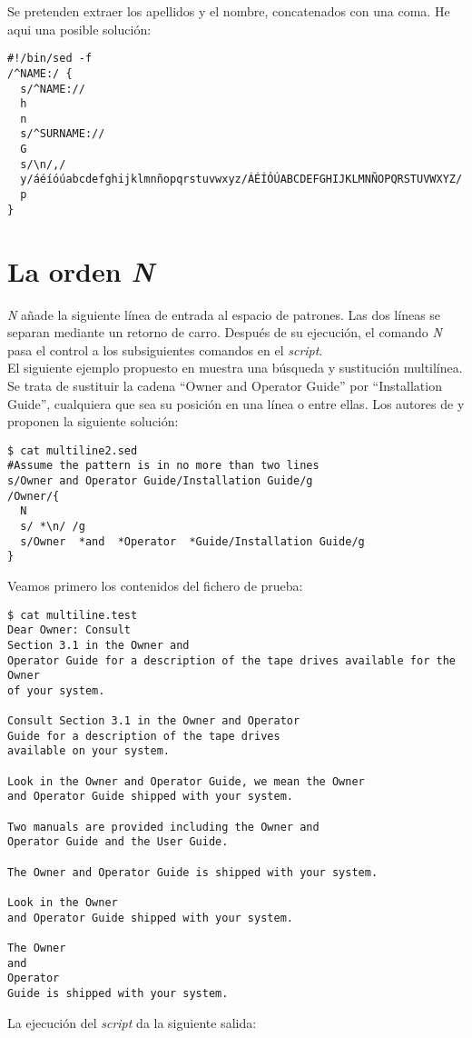 Se pretenden extraer los apellidos y el nombre, concatenados con una coma. He aqui una posible solución:
\begin{verbatim}
#!/bin/sed -f
/^NAME:/ {
  s/^NAME://
  h
  n
  s/^SURNAME://
  G
  s/\n/,/
  y/áéíóúabcdefghijklmnñopqrstuvwxyz/ÁÉÍÓÚABCDEFGHIJKLMNÑOPQRSTUVWXYZ/
  p
}
\end{verbatim}

\section{La orden {\it N}}
{\it N} añade la siguiente línea de entrada al espacio de
patrones. Las dos líneas se separan mediante un retorno de
carro. Después de su ejecución, el comando {\it N} pasa el control a los
subsiguientes comandos en el {\it script}.\\
El siguiente ejemplo propuesto en \cite{sedawk} muestra una
búsqueda y sustitución multilínea. Se trata de sustituir la
cadena ``Owner and Operator Guide'' por ``Installation Guide'', cualquiera que sea su posición en una línea o entre ellas.
Los autores de \cite{sedawk} y \cite{power} proponen la siguiente
solución:
\begin{verbatim}
$ cat multiline2.sed
#Assume the pattern is in no more than two lines
s/Owner and Operator Guide/Installation Guide/g
/Owner/{
  N
  s/ *\n/ /g
  s/Owner  *and  *Operator  *Guide/Installation Guide/g
}                    
\end{verbatim}
Veamos primero los contenidos del fichero de prueba:
\begin{verbatim}
$ cat multiline.test
Dear Owner: Consult
Section 3.1 in the Owner and
Operator Guide for a description of the tape drives available for the Owner
of your system.
 
Consult Section 3.1 in the Owner and Operator
Guide for a description of the tape drives
available on your system.
 
Look in the Owner and Operator Guide, we mean the Owner
and Operator Guide shipped with your system.
 
Two manuals are provided including the Owner and
Operator Guide and the User Guide.
 
The Owner and Operator Guide is shipped with your system.
 
Look in the Owner
and Operator Guide shipped with your system.
 
The Owner
and
Operator
Guide is shipped with your system.   
\end{verbatim}
La ejecución del {\it script} da la siguiente salida:
